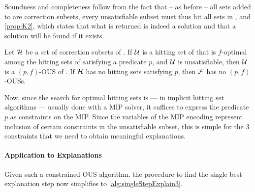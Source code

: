 Soundness and completeness  follow from the fact that -- as before -- all sets added to \setstohit are correction subsets,  every unsatisfiable subset must thus hit all sets in \setstohit, and \cref{prop:K2}, which states that what is returned is indeed a solution and that a solution will be found if it exists. 
 
\begin{proposition}\label{prop:K2}
  Let $\mathcal{H}$ be a set of correction subsets of \mcses{\formula}. 
  If $\mathcal{U}$ is a hitting set of  that is $f$-optimal among the hitting sets of  satisfying a predicate $p$, and  $\mathcal{U}$ is unsatisfiable, then $\mathcal{U}$ is a $(p,f)$-OUS of \formula. 
  If  $\mathcal{H}$ has no hitting sets satisfying $p$, then $\mathcal{F} $ has no $(p,f)$-OUSs.
\end{proposition}

Now, since the search for optimal hitting sets is --- in implicit hitting set algorithms --- usually done with a MIP solver, it suffices to express the predicate $p$ as constraints on the MIP. Since the variables of the MIP encoding represent inclusion of certain constraints in the unsatisfiable subset, this is simple for  the 3 constraints that we need to obtain meaningful explanations. %

\paragraph{Application to Explanations}
% 
Given such a constrained OUS algorithm, the procedure to find the single best explanation step now simplifies to \cref{alg:singleStepExplain3}.

